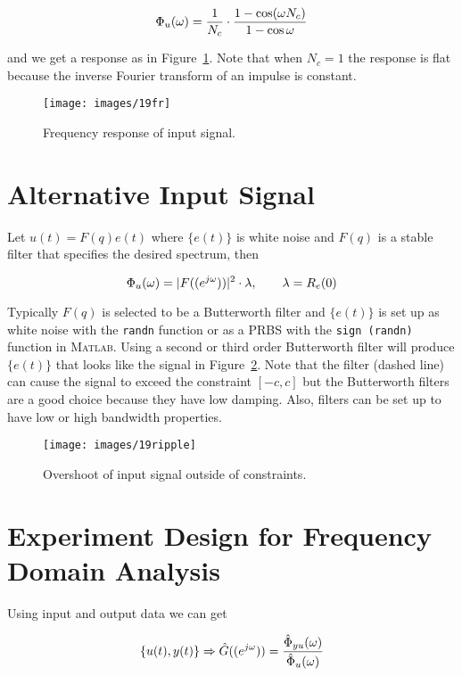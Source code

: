 \begin{equation*}
\Phi_u(\omega) = \frac{1}{N_c}\cdot\frac{1-\cos(\omega N_c)}{1-\cos\omega}
\end{equation*}

and we get a response as in Figure~\ref{fig:19fr}.
Note that when $N_c=1$ the response is flat because the inverse Fourier transform of an impulse is constant.

\begin{figure}[ht!]
\centering
\texttt{[image: images/19fr]}
\caption{Frequency response of input signal.}%
\label{fig:19fr}
\end{figure}

\section{Alternative Input Signal}
Let $u(t)=F(q)e(t)$ where $\{e(t)\}$ is white noise and $F(q)$ is a stable filter that specifies the desired spectrum, then

\begin{equation*}
\Phi_u(\omega) = |F((e^{j\omega}))|^2\cdot\lambda, \qquad \lambda = R_e(0)
\end{equation*}

Typically $F(q)$ is selected to be a Butterworth filter and $\{e(t)\}$ is set up as white noise with the \texttt{randn} function or as a PRBS with the \texttt{sign (randn)} function in \textsc{Matlab}.
Using a second or third order Butterworth filter will produce $\{e(t)\}$ that looks like the signal in Figure~\ref{fig:19ripple}.
Note that the filter (dashed line) can cause the signal to exceed the constraint $[-c,c]$ but the Butterworth filters are a good choice because they have low damping.
Also, filters can be set up to have low or high bandwidth properties.

\begin{figure}[ht!]
\centering
\texttt{[image: images/19ripple]}
\caption{Overshoot of input signal outside of constraints.}%
\label{fig:19ripple}
\end{figure}

\section{Experiment Design for Frequency Domain Analysis}
Using input and output data we can get

\begin{equation*}
\{u(t),y(t)\} \Rightarrow \hat{G}((e^{j\omega})) = \frac{\hat{\Phi}_{yu}(\omega)}{\hat{\Phi}_u(\omega)}
\end{equation*}

